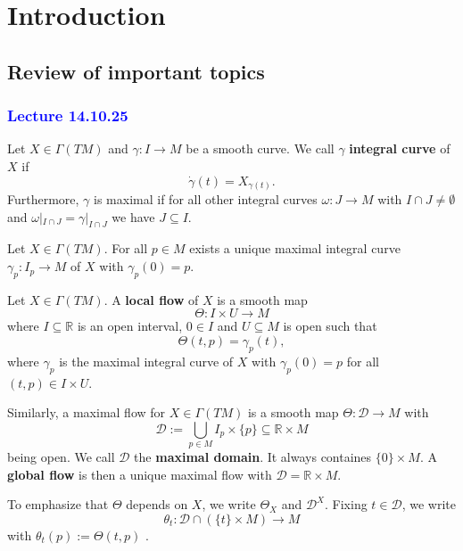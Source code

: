 \chapter{Introduction}
\setcounter{section}{-1}
\section{Review of important topics}
\subsection{\textcolor{blue}{Lecture 14.10.25}}
\begin{definition}
    Let $X \in \Gamma(TM)$ and $\gamma: I \to M$ be a smooth curve. We call $\gamma$ \textbf{integral curve} of $X$ if \[
        \dot{\gamma}(t)=X_{\gamma(t)}
    .\] Furthermore, $\gamma$ is maximal if for all other integral curves $\omega: J \to M$ with $I \cap J \neq \emptyset$ and $\omega|_{I \cap J}=\gamma|_{I \cap J}$ we have $J \subseteq I$.
\end{definition}
\begin{theorem}
    Let $X \in \Gamma(TM)$. For all $p \in M$ exists a unique maximal integral curve $\gamma_p: I_p \to M$ of $X$ with $\gamma_p(0)=p$.
\end{theorem}
\begin{definition}
    Let $X \in \Gamma(TM)$. A \textbf{local flow} of $X$ is a smooth map \[
    \Theta: I \times U \to M
    \] where $I \subseteq \mathbb{R}$ is an open interval, $0 \in I$ and $U \subseteq M$ is open such that \[
    \Theta(t,p)=\gamma_p(t)
    ,\]  where $\gamma_p$ is the maximal integral curve of $X$ with $\gamma_p(0)=p$ for all $(t,p) \in I \times U$.
\end{definition}
\begin{note}
    Similarly, a maximal flow for $X \in \Gamma(TM)$ is a smooth map $\Theta: \mathcal{D} \to M$ with \[
        \mathcal{D}:=\bigcup_{p \in M} I_p \times \{p\} \subseteq \mathbb{R} \times M
    \] being open. We call $\mathcal{D}$ the \textbf{maximal domain}. It always containes $\{0\} \times M$. A \textbf{global flow} is then a unique maximal flow with $\mathcal{D}=\mathbb{R} \times M$.
\end{note}
\begin{notation}
    To emphasize that $\Theta$ depends on $X$, we write $\Theta_X$ and $\mathcal{D}^X$. Fixing $t \in \mathcal{D}$, we write \[
        \theta_t: \mathcal{D} \cap (\{t\} \times M) \to M
    \] with $\theta_t(p):=\Theta(t,p)$ .
\end{notation}

